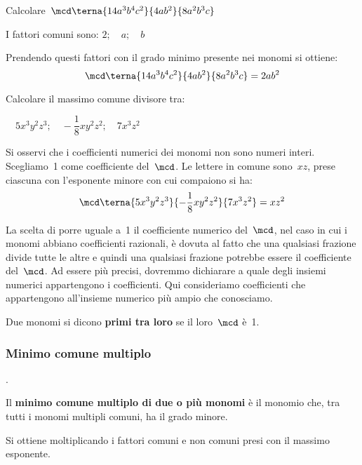 \begin{esempio}{}{}
Calcolare~\(\mcd \terna{14a^{3}b^{4}c^{2}}{4ab^{2}}{8a^{2}b^{3}c}\) 

I fattori comuni sono: \quad 
\(2; \quad a; \quad b\)

Prendendo questi fattori con il grado minimo presente nei monomi 
si ottiene:
\[\mcd \terna{14a^{3}b^{4}c^{2}}{4ab^{2}}{8a^{2}b^{3}c}=2ab^{2}\]
\end{esempio}

\begin{esempio}{}{}
Calcolare il massimo comune divisore tra: 

\(\quad 5x^{3}y^{2}z^{3}; \quad -\dfrac{1}{8}xy^{2}z^{2}; 
  \quad 7x^{3}z^{2}\)

Si osservi che i coefficienti numerici dei monomi non sono numeri interi.
Scegliamo~1 come coefficiente del~\(\mcd\).
Le lettere in comune sono~\(xz\), prese ciascuna con
l'esponente minore con cui compaiono si ha:
\[\mcd \terna{5x^{3}y^{2}z^{3}}{-\frac{1}{8}xy^{2}z^{2}}{7x^{3}z^{2}} = 
  xz^{2}\]
\end{esempio}


\begin{osservazione}{}{} 
La scelta di porre uguale a~1 il coefficiente 
numerico del~\(\mcd\), nel
caso in cui i monomi abbiano coefficienti razionali, è dovuta al
fatto che una qualsiasi frazione divide tutte le altre e quindi una
qualsiasi frazione potrebbe essere il coefficiente del~\(\mcd\).
Ad essere più precisi, dovremmo dichiarare a quale degli insiemi 
numerici appartengono i coefficienti. 
Qui consideriamo coefficienti che appartengono all'insieme numerico 
più ampio che conosciamo.
\end{osservazione}


\begin{definizione}{}{}
Due monomi si dicono \textbf{primi tra loro}
 se il loro~\(\mcd\) è~1.
\end{definizione}

\subsubsection{Minimo comune multiplo}
.

\begin{definizione}{}{}
Il \textbf{minimo comune multiplo di due o più monomi}
è il monomio che, tra tutti i monomi multipli comuni,
ha il grado minore.

Si ottiene moltiplicando i fattori comuni e non comuni presi con il massimo 
esponente.
\end{definizione}

